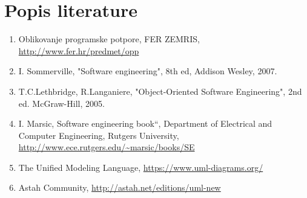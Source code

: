 \chapter*{Popis literature}
		\begin{enumerate}
			
			
			\item  Oblikovanje programske potpore, FER ZEMRIS, \url{http://www.fer.hr/predmet/opp}
			
			\item  I. Sommerville, "Software engineering", 8th ed, Addison Wesley, 2007.
			
			\item  T.C.Lethbridge, R.Langaniere, "Object-Oriented Software Engineering", 2nd ed. McGraw-Hill, 2005.
			
			\item  I. Marsic, Software engineering book``, Department of Electrical and Computer Engineering, Rutgers University, \url{http://www.ece.rutgers.edu/~marsic/books/SE}
			
			\item  The Unified Modeling Language, \url{https://www.uml-diagrams.org/}
			
			\item  Astah Community, \url{http://astah.net/editions/uml-new}
		\end{enumerate}
		
		 